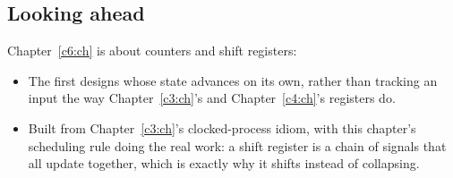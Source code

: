 \subsection*{Looking ahead}
Chapter~\ref{c6:ch} is about counters and shift registers:
\begin{itemize}
  \item The first designs whose state advances on its own, rather than tracking an input the way
    Chapter~\ref{c3:ch}'s and Chapter~\ref{c4:ch}'s registers do.
  \item Built from Chapter~\ref{c3:ch}'s clocked-process idiom, with this chapter's scheduling rule
    doing the real work: a shift register is a chain of signals that all update together, which is
    exactly why it shifts instead of collapsing.
\end{itemize}
